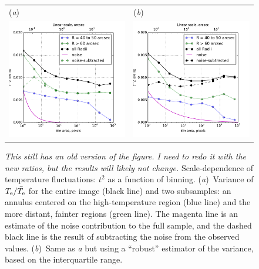 \documentclass[preprint]{aastex}
\begin{document}
\begin{figure}
  \centering

  \begin{tabular}{ll}
    (\textit{a}) & (\textit{b}) \\
    \includegraphics[width=0.45\linewidth]{Tsq-nii-vs-binning-normal} &
    \includegraphics[width=0.45\linewidth]{Tsq-nii-vs-binning-robust}
  \end{tabular}
  \caption{\textit{This still has an old version of the figure.  I
      need to redo it with the new ratios, but the results will likely
      not change.}  Scale-dependence of temperature fluctuations:
    \(t^2\) as a function of binning. (\textit{a})~Variance of
    \(T_{\mathrm{e}}/\bar{T_{\mathrm{e}}}\) for the entire image (black line) and two
    subsamples: an annulus centered on the high-temperature region
    (blue line) and the more distant, fainter regions (green line).
    The magenta line is an estimate of the noise contribution to the
    full sample, and the dashed black line is the result of
    subtracting the noise from the observed values.  (\textit{b})~Same
    as \textit{a} but using a ``robust'' estimator of the variance,
    based on the interquartile range.}
  \label{fig:tsq-nii-vs-binning}
\end{figure}


\end{document}

